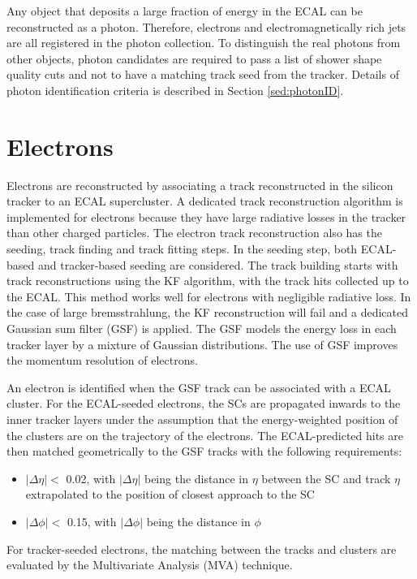 \documentclass[thesis.tex]{subfiles}
\begin{document}
Any object that deposits a large fraction of energy in the ECAL can be reconstructed as a photon.
Therefore, electrons and electromagnetically rich jets are all registered in the photon collection. 
To distinguish the real photons from other objects, photon candidates are required to pass a list of shower shape quality cuts and not to have a matching track seed from the tracker. 
Details of photon identification criteria is described in Section \ref{sed:photonID}.

\section{Electrons}

Electrons are reconstructed by associating a track reconstructed in the silicon tracker to an ECAL supercluster.
A dedicated track reconstruction algorithm is implemented for electrons because they have large radiative losses in the tracker than other charged particles.
The electron track reconstruction also has the seeding, track finding and track fitting steps. 
In the seeding step, both ECAL-based and tracker-based seeding are considered. 
The track building starts with track reconstructions using the KF algorithm, with the track hits collected up to the ECAL. 
This method works well for electrons with negligible radiative loss. 
In the case of large bremsstrahlung, the KF reconstruction will fail and a dedicated Gaussian sum filter (GSF) is applied. 
The GSF models the energy loss in each tracker layer by a mixture of Gaussian distributions.
The use of GSF improves the momentum resolution of electrons. 

An electron is identified when the GSF track can be associated with a ECAL cluster. 
For the ECAL-seeded electrons, the SCs are propagated inwards to the inner tracker layers under the assumption that the energy-weighted position of the clusters are on the trajectory of the electrons. 
The ECAL-predicted hits are then matched geometrically to the GSF tracks with the following requirements: 
\begin{itemize}
	\item $|\Delta\eta| < $ 0.02, with $|\Delta\eta|$ being the distance in $\eta$ between the SC and track $\eta$ extrapolated to the position of closest approach to the SC
	\item $|\Delta\phi| < $ 0.15, with  $|\Delta\phi|$ being the distance in $\phi$
\end{itemize}
For tracker-seeded electrons, the matching between the tracks and clusters are evaluated by the Multivariate Analysis (MVA) technique. 
\end{document}
